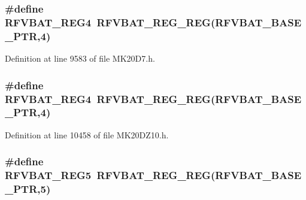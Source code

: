 \subsubsection[{\texorpdfstring{R\+F\+V\+B\+A\+T\+\_\+\+R\+E\+G4}{RFVBAT_REG4}}]{\setlength{\rightskip}{0pt plus 5cm}\#define R\+F\+V\+B\+A\+T\+\_\+\+R\+E\+G4~{\bf R\+F\+V\+B\+A\+T\+\_\+\+R\+E\+G\+\_\+\+R\+EG}({\bf R\+F\+V\+B\+A\+T\+\_\+\+B\+A\+S\+E\+\_\+\+P\+TR},4)}\hypertarget{group___r_f_v_b_a_t___register___accessor___macros_ga94341c77e156361945ba570c7cf9d02a}{}\label{group___r_f_v_b_a_t___register___accessor___macros_ga94341c77e156361945ba570c7cf9d02a}


Definition at line 9583 of file M\+K20\+D7.\+h.

\subsubsection[{\texorpdfstring{R\+F\+V\+B\+A\+T\+\_\+\+R\+E\+G4}{RFVBAT_REG4}}]{\setlength{\rightskip}{0pt plus 5cm}\#define R\+F\+V\+B\+A\+T\+\_\+\+R\+E\+G4~{\bf R\+F\+V\+B\+A\+T\+\_\+\+R\+E\+G\+\_\+\+R\+EG}({\bf R\+F\+V\+B\+A\+T\+\_\+\+B\+A\+S\+E\+\_\+\+P\+TR},4)}\hypertarget{group___r_f_v_b_a_t___register___accessor___macros_ga94341c77e156361945ba570c7cf9d02a}{}\label{group___r_f_v_b_a_t___register___accessor___macros_ga94341c77e156361945ba570c7cf9d02a}


Definition at line 10458 of file M\+K20\+D\+Z10.\+h.

\subsubsection[{\texorpdfstring{R\+F\+V\+B\+A\+T\+\_\+\+R\+E\+G5}{RFVBAT_REG5}}]{\setlength{\rightskip}{0pt plus 5cm}\#define R\+F\+V\+B\+A\+T\+\_\+\+R\+E\+G5~{\bf R\+F\+V\+B\+A\+T\+\_\+\+R\+E\+G\+\_\+\+R\+EG}({\bf R\+F\+V\+B\+A\+T\+\_\+\+B\+A\+S\+E\+\_\+\+P\+TR},5)}\hypertarget{group___r_f_v_b_a_t___register___accessor___macros_ga59735a620ffb54ec36ce0b413be0ac35}{}\label{group___r_f_v_b_a_t___register___accessor___macros_ga59735a620ffb54ec36ce0b413be0ac35}


